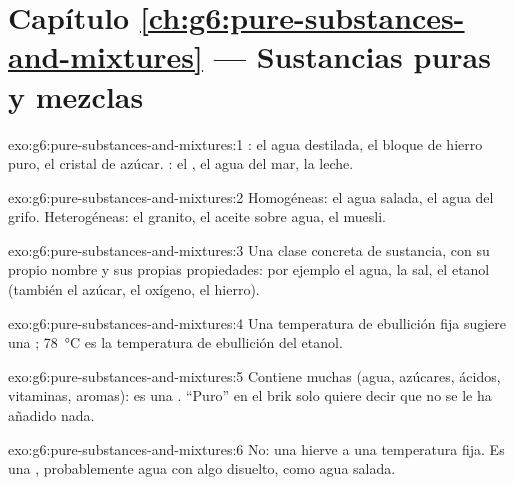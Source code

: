 \section*{Capítulo \ref{ch:g6:pure-substances-and-mixtures} --- Sustancias puras y mezclas}

\begin{solution}{exo:g6:pure-substances-and-mixtures:1}
: el agua destilada, el bloque de hierro puro, el
cristal de azúcar. : el , el agua del mar, la leche.
\end{solution}

\begin{solution}{exo:g6:pure-substances-and-mixtures:2}
Homogéneas: el agua salada, el agua del grifo. Heterogéneas: el granito,
el aceite sobre agua, el muesli.
\end{solution}

\begin{solution}{exo:g6:pure-substances-and-mixtures:3}
Una clase concreta de sustancia, con su propio nombre y sus propias
propiedades: por ejemplo el agua, la sal, el etanol (también el azúcar,
el oxígeno, el hierro).
\end{solution}

\begin{solution}{exo:g6:pure-substances-and-mixtures:4}
Una temperatura de ebullición fija sugiere una ;
\qty{78}{\celsius} es la temperatura de ebullición del etanol.
\end{solution}

\begin{solution}{exo:g6:pure-substances-and-mixtures:5}
Contiene muchas  (agua, azúcares, ácidos, vitaminas,
aromas): es una . ``Puro'' en el brik solo quiere decir que no se
le ha añadido nada.
\end{solution}

\begin{solution}{exo:g6:pure-substances-and-mixtures:6}
No: una  hierve a una temperatura fija. Es una ,
probablemente agua con algo disuelto, como agua salada.
\end{solution}

